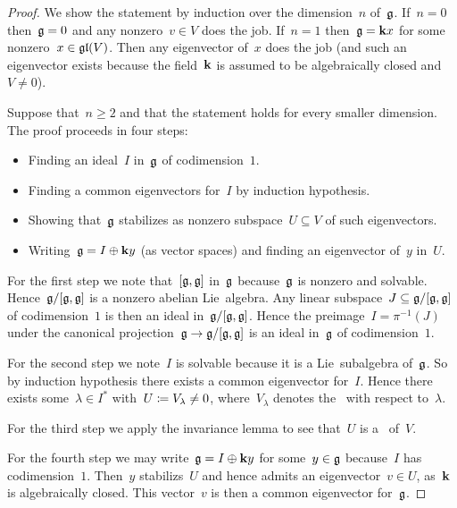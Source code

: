 \begin{proof}
  We show the statement by induction over the dimension~$n$ of~$\glie$.
  If~$n = 0$ then~$\mathfrak{g} = 0$ and any nonzero~$v \in V$ does the job.
  If~$n = 1$ then~$\mathfrak{g} = \mathbf{k} x$ for some nonzero~$x \in \mathfrak{gl}(V)$.
  Then any eigenvector of~$x$ does the job (and such an eigenvector exists because the field~$\mathbf{k}$ is assumed to be algebraically closed and~$V \neq 0$).
 
  Suppose that~$n \geq 2$ and that the statement holds for every smaller dimension.
  The proof proceeds in four steps:
  \begin{itemize}
    \item
      Finding an ideal~$I$ in~$\glie$ of codimension~$1$.
    \item
      Finding a common eigenvectors for~$I$ by induction hypothesis.
    \item
      Showing that~$\glie$ stabilizes as nonzero subspace~$U \subseteq V$ of such eigenvectors.
    \item
      Writing~$\mathfrak{g} = I \oplus \mathbf{k} y$ (as vector spaces) and finding an eigenvector of~$y$ in~$U$.
  \end{itemize}

  For the first step we note that~$[\mathfrak{g},\mathfrak{g}]$ in~$\glie$ because~$\glie$ is nonzero and solvable.
  Hence~$\mathfrak{g}/[\mathfrak{g},\mathfrak{g}]$ is a nonzero abelian Lie~algebra.
  Any linear subspace~$J \subseteq \mathfrak{g}/[\mathfrak{g},\mathfrak{g}]$ of codimension~$1$ is then an ideal in~$\mathfrak{g}/[\mathfrak{g},\mathfrak{g}]$.
  Hence the preimage~$I = \pi^{-1}(J)$ under the canonical projection~$\mathfrak{g} \to \mathfrak{g}/[\mathfrak{g},\mathfrak{g}]$ is an ideal in~$\glie$ of codimension~$1$.
 
  For the second step we note~$I$ is solvable because it is a Lie~subalgebra of~$\glie$.
  So by induction hypothesis there exists a common eigenvector for~$I$.
  Hence there exists some~$\lambda \in I^*$ with~$U \coloneqq V_\lambda \neq 0$, where~$V_\lambda$ denotes the~{} with respect to~$\lambda$.
  
  For the third step we apply the invariance lemma to see that~$U$ is a~{\subrepresentation{$\glie$}} of~$V$.
 
  For the fourth step we may write~$\mathfrak{g} = I \oplus \mathbf{k} y$ for some~$y \in \mathfrak{g}$ because~$I$ has codimension~$1$.
  Then~$y$ stabilizs~$U$ and hence admits an eigenvector~$v \in U$, as~$\mathbf{k}$ is algebraically closed.
  This vector~$v$ is then a common eigenvector for~$\glie$.
\end{proof}



